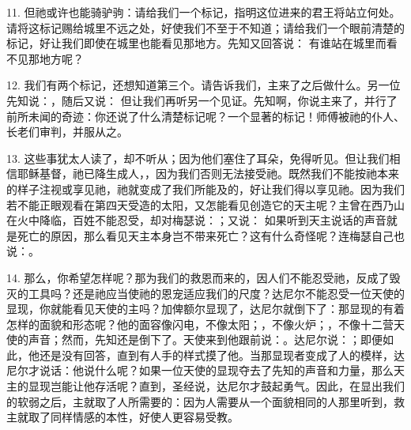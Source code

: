 11. 但祂或许也能骑驴驹：请给我们一个标记，指明这位进来的君王将站立何处。请将这标记赐给城里不远之处，好使我们不至于不知道；请给我们一个眼前清楚的标记，好让我们即使在城里也能看见那地方。先知又回答说： 有谁站在城里而看不见那地方呢？\par

12. 我们有两个标记，还想知道第三个。请告诉我们，主来了之后做什么。另一位先知说：，随后又说： 但让我们再听另一个见证。先知啊，你说主来了，并行了前所未闻的奇迹：你还说了什么清楚标记呢？一个显著的标记！师傅被祂的仆人、长老们审判，并服从之。\par

13. 这些事犹太人读了，却不听从；因为他们塞住了耳朵，免得听见。但让我们相信耶稣基督，祂已降生成人，，因为我们否则无法接受祂。既然我们不能按祂本来的样子注视或享见祂，祂就变成了我们所能及的，好让我们得以享见祂。因为我们若不能正眼观看在第四天受造的太阳，又怎能看见创造它的天主呢？主曾在西乃山在火中降临，百姓不能忍受，却对梅瑟说：；又说： 如果听到天主说话的声音就是死亡的原因，那么看见天主本身岂不带来死亡？这有什么奇怪呢？连梅瑟自己也说：。\par

14. 那么，你希望怎样呢？那为我们的救恩而来的，因人们不能忍受祂，反成了毁灭的工具吗？还是祂应当使祂的恩宠适应我们的尺度？达尼尔不能忍受一位天使的显现，你就能看见天使的主吗？加俾额尔显现了，达尼尔就倒下了：那显现的有着怎样的面貌和形态呢？他的面容像闪电，不像太阳；，不像火炉；，不像十二营天使的声音；然而，先知还是倒下了。天使来到他跟前说：。达尼尔说：；即便如此，他还是没有回答，直到有人手的样式摸了他。当那显现者变成了人的模样，达尼尔才说话：他说什么呢？如果一位天使的显现夺去了先知的声音和力量，那么天主的显现岂能让他存活呢？直到，圣经说，达尼尔才鼓起勇气。因此，在显出我们的软弱之后，主就取了人所需要的：因为人需要从一个面貌相同的人那里听到，救主就取了同样情感的本性，好使人更容易受教。\par

